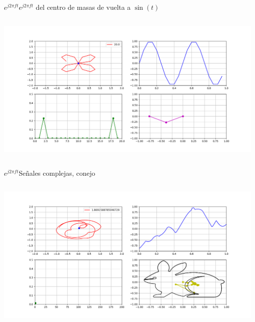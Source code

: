 \begin{frame}{$e^{j2\pi ft}$}{$e^{j2\pi ft}$ del centro de masas de vuelta a $\sin(t)$}
   \handsonicon
   \begin{columns}[onlytextwidth]
      
      
      \centering\includegraphics[width=1.0\textwidth]{3_clase/euler5}
   \end{columns}
   \vfill
\end{frame}
\begin{frame}{$e^{j2\pi ft}$}{Señales complejas, conejo}
   \handsonicon
   \begin{columns}[onlytextwidth]
      
      
      \centering\includegraphics[width=1.0\textwidth]{3_clase/euler6}
   \end{columns}
   \vfill
\end{frame}
